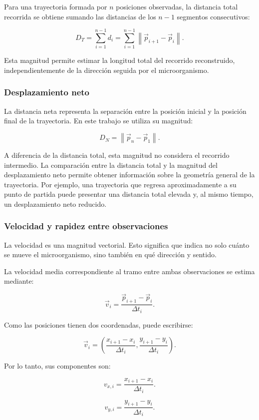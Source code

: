 Para una trayectoria formada por $n$ posiciones observadas, la distancia total recorrida se obtiene sumando las distancias de los $n - 1$ segmentos consecutivos:

\[
D_T=\sum_{i=1}^{n-1}d_i
=\sum_{i=1}^{n-1}\left\|\vec{p}_{i+1}-\vec{p}_i\right\|.
\]

Esta magnitud permite estimar la longitud total del recorrido reconstruido, independientemente de la dirección seguida por el microorganismo.

\subsubsection{Desplazamiento neto}

La distancia neta representa la separación entre la posición inicial y la posición final de la trayectoria. En este trabajo se utiliza su magnitud:

\[
D_N=\left\|\vec{p}_n-\vec{p}_1\right\|.
\]

A diferencia de la distancia total, esta magnitud no considera el recorrido intermedio. La comparación entre la distancia total y la magnitud del desplazamiento neto permite obtener información sobre la geometría general de la trayectoria. Por ejemplo, una trayectoria que regresa aproximadamente a su punto de partida puede presentar una distancia total elevada y, al mismo tiempo, un desplazamiento neto reducido.

\subsubsection{Velocidad y rapidez entre observaciones}

La velocidad es una magnitud vectorial. Esto significa que indica no solo cuánto se mueve el microorganismo, sino también en qué dirección y sentido.

La velocidad media correspondiente al tramo entre ambas observaciones se estima mediante:

\[
\vec{v}_i=\frac{\vec{p}_{i+1}-\vec{p}_i}{\Delta t_i}.
\]

Como las posiciones tienen dos coordenadas, puede escribirse:

\[
\vec{v}_i=
\left(
\frac{x_{i+1}-x_i}{\Delta t_i},
\frac{y_{i+1}-y_i}{\Delta t_i}
\right).
\]

Por lo tanto, sus componentes son:

\[
v_{x,i}=\frac{x_{i+1}-x_i}{\Delta t_i}.
\]

\[
v_{y,i}=\frac{y_{i+1}-y_i}{\Delta t_i}.
\]

